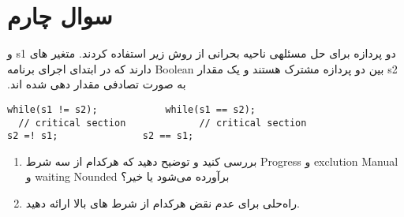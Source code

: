 \section{سوال چارم}

‫دو‬ ‫پردازه‬ ‫برای ‫حل‬ ‫مسئله‬‫ی‬ ‫ناحیه‬ ‫بحرانی‬ ‫از‬ ‫روش‬ ‫زیر‬ ‫استفاده‬ ‫کردند‬. متغیر های s1 و s2 بین دو پردازه مشترک هستند و یک مقدار Boolean دارند که ‫در‬ ‫ابتدای‬ ‫اجرای‬ ‫برنامه‬ ‫به‬ ‫صورت‬ ‫تصادفی‬ ‫مقدار‬ ‫دهی‬ ‫شده‬ ‫اند‬.
\begin{latin}
\begin{lstlisting}
while(s1 != s2);			while(s1 == s2);
  // critical section			  // critical section
s2 =! s1; 				s2 == s1;			
\end{lstlisting}
\end{latin}

\begin{enumerate}
	\item بررسی کنید و توضیح دهید که هرکدام از سه شرط Progress و exclution Manual و waiting Nounded برآورده می‌شود یا خیر؟
	
	\item راه‌حلی برای عدم نقض هرکدام از شرط های بالا ارائه دهید.
\end{enumerate}


